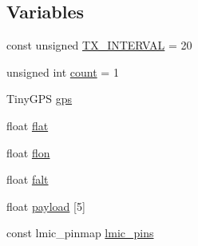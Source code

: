 \subsection*{Variables}
\begin{DoxyCompactItemize}
\item 
const unsigned \hyperlink{Uno__Dragino__LoRa__GPS__Shield__TTN_8ino_a48aaa6046ac1d9b5b7172f7be7a6f7e1}{T\-X\-\_\-\-I\-N\-T\-E\-R\-V\-A\-L} = 20
\item 
unsigned int \hyperlink{Uno__Dragino__LoRa__GPS__Shield__TTN_8ino_a16ff2d8e15ade4948398b0aeb80124a8}{count} = 1
\item 
Tiny\-G\-P\-S \hyperlink{Uno__Dragino__LoRa__GPS__Shield__TTN_8ino_a4e2f9a5d1b23f30f530101af71f72744}{gps}
\item 
float \hyperlink{Uno__Dragino__LoRa__GPS__Shield__TTN_8ino_a7704874024acbf9afb7659fe7dcc2fda}{flat}
\item 
float \hyperlink{Uno__Dragino__LoRa__GPS__Shield__TTN_8ino_a4384a537c9d292e9bf6fd52063daf571}{flon}
\item 
float \hyperlink{Uno__Dragino__LoRa__GPS__Shield__TTN_8ino_a630497f5fdb7d5f5130835e31f23916e}{falt}
\item 
float \hyperlink{Uno__Dragino__LoRa__GPS__Shield__TTN_8ino_a78a402d1762842473567de90b11ed256}{payload} \mbox{[}5\mbox{]}
\item 
const lmic\-\_\-pinmap \hyperlink{Uno__Dragino__LoRa__GPS__Shield__TTN_8ino_a82b2c57ed09941537a4e8bf84b35a5eb}{lmic\-\_\-pins}
\end{DoxyCompactItemize}



